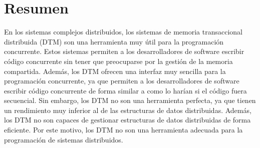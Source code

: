 \pagebreak
\thispagestyle{empty}
\section*{Resumen}

En los sistemas complejos distribuidos, los sistemas de memoria transaccional distribuida (DTM) son una herramienta muy útil para la programación concurrente. Estos sistemas permiten a los desarrolladores de software escribir código concurrente sin tener que preocuparse por la gestión de la memoria compartida. Además, los DTM ofrecen una interfaz muy sencilla para la programación concurrente, ya que permiten a los desarrolladores de software escribir código concurrente de forma similar a como lo harían si el código fuera secuencial. Sin embargo, los DTM no son una herramienta perfecta, ya que tienen un rendimiento muy inferior al de las estructuras de datos distribuidas. Además, los DTM no son capaces de gestionar estructuras de datos distribuidas de forma eficiente. Por este motivo, los DTM no son una herramienta adecuada para la programación de sistemas distribuidos.

\vfill